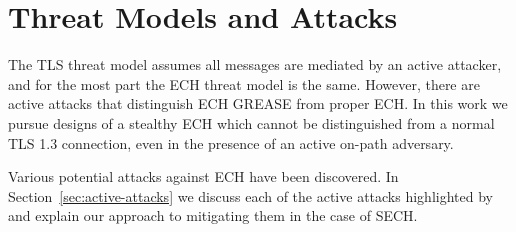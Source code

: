 



\section{Threat Models and Attacks}

The \ac{TLS} threat model assumes all messages
are mediated by an active attacker,
and for the most part the \ac{ECH} threat model is the same.
However, there are active attacks that distinguish
\ac{ECH} \ac{GREASE} from proper \ac{ECH}.
In this work we pursue designs of a stealthy \ac{ECH}
which cannot be distinguished from a normal \ac{TLS} 1.3 connection,
even in the presence
of an active on-path adversary.

Various potential attacks against \ac{ECH}
have been discovered.
In Section~\ref{sec:active-attacks} we discuss
each of the active attacks highlighted by \cite{esni}
and explain our approach to mitigating them in the case of \ac{SECH}.

